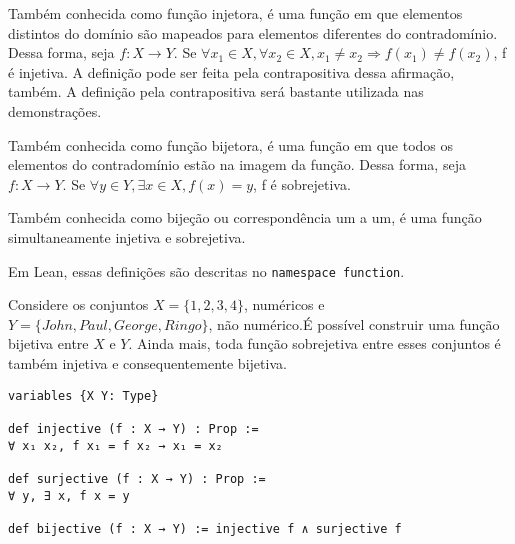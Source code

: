 \begin{definition}
    \label{def5}
    Também conhecida como função injetora, é uma função em que elementos
    distintos do domínio são mapeados para elementos diferentes do
    contradomínio. Dessa forma, seja $f: X \to Y$. Se $\forall x_1 \in X,
    \forall x_2 \in X, x_1 \neq x_2 \Rightarrow f(x_1) \neq f(x_2) $, f é
    injetiva. A definição pode ser feita pela contrapositiva dessa afirmação,
    também. A definição pela contrapositiva será bastante utilizada nas
    demonstrações.
\end{definition}

\begin{definition}
    \label{def6}
    Também conhecida como função bijetora, é uma função em que todos os
    elementos do contradomínio estão na imagem da função. Dessa forma, seja
    $f: X \to Y$. Se $\forall y \in Y, \exists x \in X, f(x) = y$, f é
    sobrejetiva.
   \end{definition}

\begin{definition}
    \label{def7}
    Também conhecida como bijeção ou correspondência um a um, é uma função
    simultaneamente injetiva e sobrejetiva.
\end{definition}

Em Lean, essas definições são descritas no \lstinline{namespace function}.

\begin{example}
    Considere os conjuntos $X = \{1,2,3,4\}$, numéricos e $Y = \{John, Paul,
    George, Ringo\}$, não numérico.É possível construir uma função
    bijetiva entre $X$ e $Y$. Ainda mais, toda função sobrejetiva entre esses
    conjuntos é também injetiva e consequentemente bijetiva.
\end{example}

\begin{lstlisting}
variables {X Y: Type}

def injective (f : X → Y) : Prop :=
∀ x₁ x₂, f x₁ = f x₂ → x₁ = x₂

def surjective (f : X → Y) : Prop :=
∀ y, ∃ x, f x = y

def bijective (f : X → Y) := injective f ∧ surjective f
\end{lstlisting}

